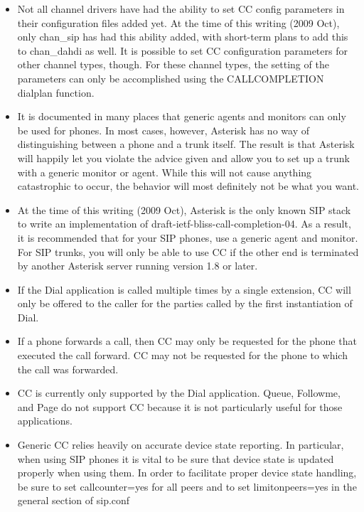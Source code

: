 \begin{itemize}
\item Not all channel drivers have had the ability to set CC config
parameters in their configuration files added yet. At the time of
this writing (2009 Oct), only chan\_sip has had this ability added, with
short-term plans to add this to chan\_dahdi as well. It is
possible to set CC configuration parameters for other channel types,
though. For these channel types, the setting of the parameters can
only be accomplished using the CALLCOMPLETION dialplan function.

\item It is documented in many places that generic agents and monitors
can only be used for phones. In most cases, however, Asterisk has no
way of distinguishing between a phone and a trunk itself. The result
is that Asterisk will happily let you violate the advice given and
allow you to set up a trunk with a generic monitor or agent. While this
will not cause anything catastrophic to occur, the behavior will most
definitely not be what you want.

\item At the time of this writing (2009 Oct), Asterisk is the only
known SIP stack to write an implementation of
draft-ietf-bliss-call-completion-04. As a result, it is recommended
that for your SIP phones, use a generic agent and monitor. For SIP
trunks, you will only be able to use CC if the other end is
terminated by another Asterisk server running version 1.8 or later.

\item If the Dial application is called multiple times by a single
extension, CC will only be offered to the caller for the parties called
by the first instantiation of Dial.

\item If a phone forwards a call, then CC may only be requested for
the phone that executed the call forward. CC may not be requested
for the phone to which the call was forwarded.

\item CC is currently only supported by the Dial application. Queue,
Followme, and Page do not support CC because it is not particularly
useful for those applications.

\item Generic CC relies heavily on accurate device state reporting. In
particular, when using SIP phones it is vital to be sure that device
state is updated properly when using them. In order to facilitate proper
device state handling, be sure to set callcounter=yes for all peers and
to set limitonpeers=yes in the general section of sip.conf


\end{itemize}
